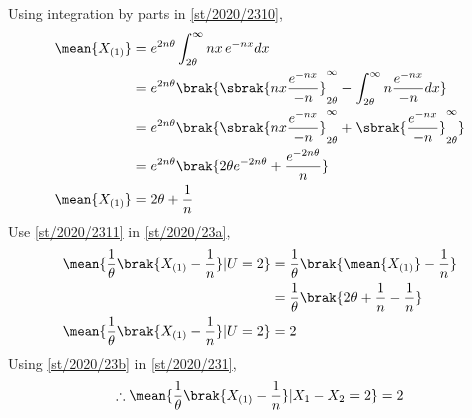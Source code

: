 Using integration by parts in \eqref{st/2020/2310},
\begin{align}
    \nonumber \mean{X_{(1)}}
  &= e^{2n\theta}\int_{2\theta}^{\infty}nx\,e^{-n x}dx\\
      \nonumber &= e^{2n\theta}\brak{\sbrak{n x \frac{e^{-n x}}{-n}}_{2\theta}^{\infty}-\int_{2\theta}^{\infty} n \frac{e^{-n x}}{-n}dx}\\
  \nonumber &= e^{2n\theta}\brak{\sbrak{n x \frac{e^{-n x}}{-n}}_{2\theta}^{\infty}+\sbrak{\frac{e^{-n x}}{-n}}_{2\theta}^{\infty}}\\
  \nonumber &= e^{2n\theta}\brak{2\theta e^{-2n\theta}+\frac{e^{-2n\theta}}{n}}\\
  \mean{X_{(1)}} &= 2\theta+\frac{1}{n}\label{st/2020/2311}
\end{align}
Use \eqref{st/2020/2311} in \eqref{st/2020/23a},
\begin{align}
   \nonumber \mean{\frac{1}{\theta}\brak{X_{(1)}-\frac{1}{n}}|U=2}
    &=\frac{1}{\theta}\brak{\mean{X_{(1)}}-\frac{1}{n}}\\
   \nonumber &=\frac{1}{\theta}\brak{2\theta+\frac{1}{n}-\frac{1}{n}}\\
   \mean{\frac{1}{\theta}\brak{X_{(1)}-\frac{1}{n}}|U=2} &= 2\label{st/2020/23b}
\end{align}
Using \eqref{st/2020/23b} in \eqref{st/2020/231},
\begin{align}
     \nonumber\therefore   \mean{\frac{1}{\theta}\brak{X_{(1)}-\frac{1}{n}}|X_1-X_2=2}=2
\end{align}